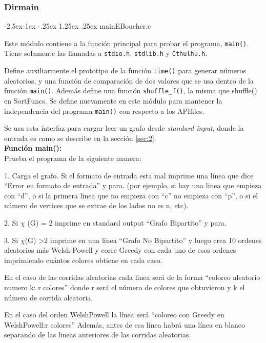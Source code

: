 \documentclass[11pt,a4paper]{article}
\makeatletter
\renewcommand\paragraph{\@startsection{paragraph}{4}{\z@}%
            {-2.5ex\@plus -1ex \@minus -.25ex}%
            {1.25ex \@plus .25ex}%
            {\normalfont\normalsize\bfseries}}
\theoremstyle{plain}
\makeatother
\begin{document}
			\subsubsection{Dirmain}
			
				\paragraph{mainEBoucher.c}

Este módulo contiene a la función principal para probar el programa, \texttt{main()}. Tiene solamente las llamadas a \texttt{stdio.h}, \texttt{stdlib.h} y \texttt{Cthulhu.h}.

Define auxiliarmente el prototipo de la función \texttt{time()} para generar números aleatorios, y una función de comparación de dos valores que se usa dentro de la función \texttt{main()}. Además define una función \texttt{shuffle\_f()}, la misma que shuffle() en SortFuncs. Se define nuevamente en este módulo para mantener la independencia del programa \texttt{main()} con respecto a los APIfiles.

Se usa esta interfaz para cargar leer un grafo desde \emph{standard input}, donde la entrada es como se describe en la sección \ref{sec:2}.\\


\textbf{{Función main():}}\\

Prueba el programa de la siguiente manera:

1. Carga el grafo. Si el formato de entrada esta mal imprime una línea que dice “Error en formato de entrada” y para. (por ejemplo, si hay una linea que empieza con “d”, o si la primera linea que no empieza con “c” no empieza con “p”, o si el número de vertices que se extrae de los lados no es n, etc).

2. Si $\chi$ (G) = 2 imprime en standard output “Grafo Bipartito” y para.

3. Si $\chi$(G) \textgreater 2 imprime en una línea “Grafo No Bipartito” y luego crea 10 ordenes aleatorios más Welsh-Powell y corre Greedy con cada uno de esos ordenes imprimiendo cuántos colores obtiene en cada caso.

En el caso de las corridas aleatorias cada linea será de la forma
“coloreo aleatorio numero k: r colores” donde r será el número de colores que obtuvieron y k el número de corrida aleatoria.

En el caso del orden WelshPowell la línea será “coloreo con Greedy en WelshPowell:r colores” Además, antes de esa línea habrá una línea en blanco separando de las lineas anteriores de las corridas aleatorias.
\end{document}
